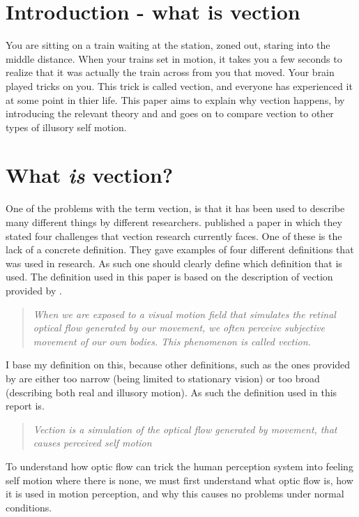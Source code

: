 \documentclass[11pt,a4paper,oneside,table,xcdraw]{article}
\begin{document}



\section{Introduction - what is vection}
You are sitting on a train waiting at the station, zoned out, staring into the middle distance. When your trains set in motion, it takes you a few seconds to realize that it was actually the train across from you that moved. Your brain played tricks on you. This trick is called vection, and everyone has experienced it at some point in thier life. This paper aims to explain why vection happens, by introducing the relevant theory and and goes on to compare vection to other types of illusory self motion. 
\section{What \textit{is} vection?}
\label{sec:def}
One of the problems with the term vection, is that it has been used to describe many different things by different researchers. \cite{challenges} published a paper in which they stated four challenges that vection research currently faces. One of these is the lack of a concrete definition. They gave examples of four different definitions that was used in research. As such one should clearly define which definition that is used. The definition used in this paper is based on the description of vection provided by \cite{vection}.
\begin{quote}
\textit{When we are exposed to a visual motion field that simulates the retinal optical flow generated by our movement, we often perceive subjective movement of our own bodies. This phenomenon is called vection.}
\end{quote}
I base my definition on this, because other definitions, such as the ones provided by \cite{challenges} are either too narrow (being limited to stationary vision) or too broad (describing both real and illusory motion). As such the definition used in this report is.
\begin{quote}
\textit{Vection is a simulation of the optical flow generated by movement, that causes perceived self motion}
\end{quote}
To understand how optic flow can trick the human perception system into feeling self motion where there is none, we must first understand what optic flow is, how it is used in motion perception, and why this causes no problems under normal conditions.
\end{document}
